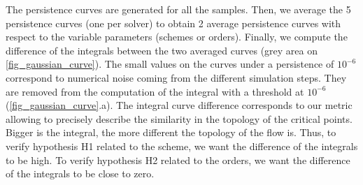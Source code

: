 The persistence curves are generated for all the samples. Then, we average the 5 persistence curves (one per solver) to obtain 2 average persistence curves with respect to the variable parameters (schemes or orders). Finally, we compute the difference of the integrals between the two averaged curves (grey area on \autoref{fig_gaussian_curve}). The small values on the curves under a persistence of $10^{-6}$ correspond to numerical noise coming from the different simulation steps. They are removed from the computation of the integral with a threshold at $10^{-6}$(\autoref{fig_gaussian_curve}.a). The integral curve difference corresponds to our metric allowing to precisely describe the similarity in the topology of the critical points. Bigger is the integral, the more different the topology of the flow is. Thus, to verify hypothesis H1 related to the scheme, we want the difference of the integrals to be high. To verify hypothesis H2 related to the orders, we want the difference of the integrals to be close to zero.


